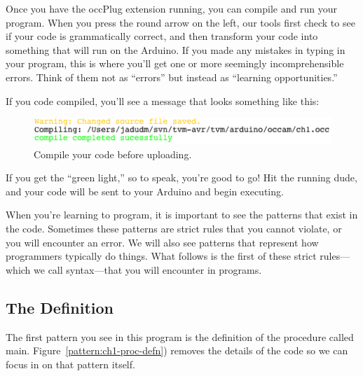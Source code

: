 Once you have the occPlug extension running, you can compile and run your program. When you press the round arrow on the left, our tools first check to see if your code is grammatically correct, and then transform your code into something that will run on the Arduino. If you made any mistakes in typing in your program, this is where you'll get one or more seemingly incomprehensible errors. Think of them not as ``errors'' but instead as ``learning opportunities.''
         
\newpage
                                
If you code compiled, you'll see a message that looks something like this:

\begin{figure}[ht]
  \begin{center}
    \includegraphics[width=0.8\linewidth]{screenshots/20100108-compile-successful}
    \caption{Compile your code before uploading.}
    \label{screenshot:compile-successful}
  \end{center}
\end{figure}

If you get the ``green light,'' so to speak, you're good to go! Hit the running dude, and your code will be sent to your Arduino and begin executing.

\PATTERNS
When you're learning to program, it is important to see the patterns that exist in the code. Sometimes these patterns are strict rules that you cannot violate, or you will encounter an error. We will also see patterns that represent how programmers typically do things. What follows is the first of these strict rules---which we call {\strong syntax}---that you will encounter in \occam programs. 

\subsection{The \PROCedure Definition}
The first pattern you see in this program is the definition of the procedure called {\code main}. Figure~\vref{pattern:ch1-proc-defn}) removes the details of the code so we can focus in on that pattern itself.

